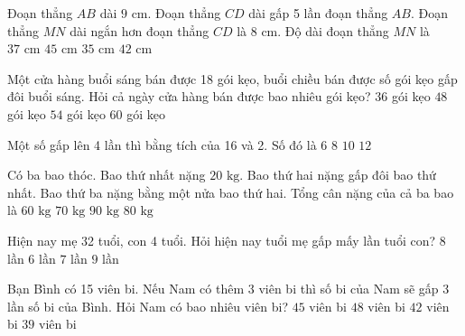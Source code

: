 \begin{ex} %
Đoạn thẳng $AB$ dài $9\text{ cm}$. Đoạn thẳng $CD$ dài gấp 5 lần đoạn thẳng $AB$. Đoạn thẳng $MN$ dài ngắn hơn đoạn thẳng $CD$ là $8\text{ cm}$. Độ dài đoạn thẳng $MN$ là
\choice
{\True $37\text{ cm}$}
{$45\text{ cm}$}
{$35\text{ cm}$}
{$42\text{ cm}$}
\end{ex}

\begin{ex} %
Một cửa hàng buổi sáng bán được 18 gói kẹo, buổi chiều bán được số gói kẹo gấp đôi buổi sáng. Hỏi cả ngày cửa hàng bán được bao nhiêu gói kẹo?
\choice
{$36$ gói kẹo}
{$48$ gói kẹo}
{\True $54$ gói kẹo}
{$60$ gói kẹo}
\end{ex}

\begin{ex} %
Một số gấp lên 4 lần thì bằng tích của 16 và 2. Số đó là
\choice
{$6$}
{\True $8$}
{$10$}
{$12$}
\end{ex}

\begin{ex} %
Có ba bao thóc. Bao thứ nhất nặng $20\text{ kg}$. Bao thứ hai nặng gấp đôi bao thứ nhất. Bao thứ ba nặng bằng một nửa bao thứ hai. Tổng cân nặng của cả ba bao là
\choice
{$60\text{ kg}$}
{$70\text{ kg}$}
{$90\text{ kg}$}
{\True $80\text{ kg}$}
\end{ex}

\begin{ex} %
Hiện nay mẹ 32 tuổi, con 4 tuổi. Hỏi hiện nay tuổi mẹ gấp mấy lần tuổi con?
\choice
{\True $8$ lần}
{$6$ lần}
{$7$ lần}
{$9$ lần}
\end{ex}

\begin{ex} %
Bạn Bình có 15 viên bi. Nếu Nam có thêm 3 viên bi thì số bi của Nam sẽ gấp 3 lần số bi của Bình. Hỏi Nam có bao nhiêu viên bi?
\choice
{$45$ viên bi}
{$48$ viên bi}
{\True $42$ viên bi}
{$39$ viên bi}
\end{ex}

